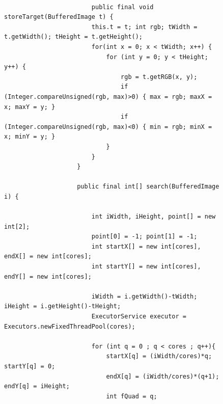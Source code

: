 \documentclass[tg]{mdtufsm}
\begin{document}
                    \begin{figure}[!htb]
                    \begin{lstlisting}

                        public final void storeTarget(BufferedImage t) {
                        this.t = t; int rgb; tWidth = t.getWidth(); tHeight = t.getHeight();
                        for(int x = 0; x < tWidth; x++) {
                            for (int y = 0; y < tHeight; y++) {
                                rgb = t.getRGB(x, y);
                                if (Integer.compareUnsigned(rgb, max)>0) { max = rgb; maxX = x; maxY = y; }
                                if (Integer.compareUnsigned(rgb, max)<0) { min = rgb; minX = x; minY = y; }
                            }
                        }
                    }

                    public final int[] search(BufferedImage i) {

                        int iWidth, iHeight, point[] = new int[2];
                        point[0] = -1; point[1] = -1;
                        int startX[] = new int[cores], endX[] = new int[cores];
                        int startY[] = new int[cores], endY[] = new int[cores];

                        iWidth = i.getWidth()-tWidth; iHeight = i.getHeight()-tHeight;
                        ExecutorService executor = Executors.newFixedThreadPool(cores);

                        for (int q = 0 ; q < cores ; q++){
                            startX[q] = (iWidth/cores)*q; startY[q] = 0;
                            endX[q] = (iWidth/cores)*(q+1); endY[q] = iHeight;
                            int fQuad = q;


\end{lstlisting}
\end{figure}
\end{document}
